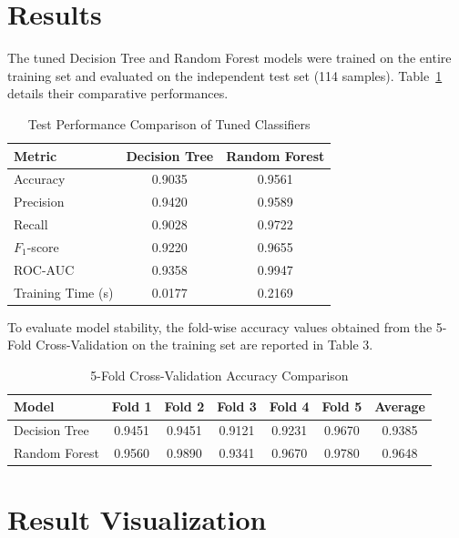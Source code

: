 \documentclass[12pt,a4paper]{article}
\begin{document}
\section{Results}
The tuned Decision Tree and Random Forest models were trained on the entire training set and evaluated on the independent test set (114 samples). Table~\ref{tab:test_results} details their comparative performances.

\begin{table}[H]
\centering
\caption{Test Performance Comparison of Tuned Classifiers}
\label{tab:test_results}
\vspace{0.2cm}
\begin{tabular}{lcc}
\toprule
\textbf{Metric} & \textbf{Decision Tree} & \textbf{Random Forest} \\
\midrule
Accuracy & 0.9035 & 0.9561 \\
Precision & 0.9420 & 0.9589 \\
Recall & 0.9028 & 0.9722 \\
$F_1$-score & 0.9220 & 0.9655 \\
ROC-AUC & 0.9358 & 0.9947 \\
Training Time (s) & 0.0177 & 0.2169 \\
\bottomrule
\end{tabular}
\end{table}

To evaluate model stability, the fold-wise accuracy values obtained from the 5-Fold Cross-Validation on the training set are reported in Table 3.

\begin{table}[H]
\centering
\caption{5-Fold Cross-Validation Accuracy Comparison}
\label{tab:cv_acc_comp}
\vspace{0.2cm}
\begin{tabular}{|l|c|c|c|c|c|c|}
\hline
\textbf{Model} & \textbf{Fold 1} & \textbf{Fold 2} & \textbf{Fold 3} & \textbf{Fold 4} & \textbf{Fold 5} & \textbf{Average} \\ \hline
Decision Tree & 0.9451 & 0.9451 & 0.9121 & 0.9231 & 0.9670 & 0.9385 \\ \hline
Random Forest & 0.9560 & 0.9890 & 0.9341 & 0.9670 & 0.9780 & 0.9648 \\ \hline
\end{tabular}
\end{table}

\section{Result Visualization}
\end{document}
